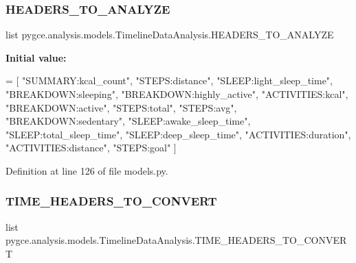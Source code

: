 \subsubsection{\texorpdfstring{H\+E\+A\+D\+E\+R\+S\+\_\+\+T\+O\+\_\+\+A\+N\+A\+L\+Y\+ZE}{HEADERS\_TO\_ANALYZE}}
{\footnotesize\ttfamily list pygce.\+analysis.\+models.\+Timeline\+Data\+Analysis.\+H\+E\+A\+D\+E\+R\+S\+\_\+\+T\+O\+\_\+\+A\+N\+A\+L\+Y\+ZE\hspace{0.3cm}{\ttfamily [static]}}

{\bfseries Initial value\+:}
\begin{DoxyCode}
=  [
        \textcolor{stringliteral}{"SUMMARY:kcal\_count"},
        \textcolor{stringliteral}{"STEPS:distance"},
        \textcolor{stringliteral}{"SLEEP:light\_sleep\_time"},
        \textcolor{stringliteral}{"BREAKDOWN:sleeping"},
        \textcolor{stringliteral}{"BREAKDOWN:highly\_active"},
        \textcolor{stringliteral}{"ACTIVITIES:kcal"},
        \textcolor{stringliteral}{"BREAKDOWN:active"},
        \textcolor{stringliteral}{"STEPS:total"},
        \textcolor{stringliteral}{"STEPS:avg"},
        \textcolor{stringliteral}{"BREAKDOWN:sedentary"},
        \textcolor{stringliteral}{"SLEEP:awake\_sleep\_time"},
        \textcolor{stringliteral}{"SLEEP:total\_sleep\_time"},
        \textcolor{stringliteral}{"SLEEP:deep\_sleep\_time"},
        \textcolor{stringliteral}{"ACTIVITIES:duration"},
        \textcolor{stringliteral}{"ACTIVITIES:distance"},
        \textcolor{stringliteral}{"STEPS:goal"}
    ]
\end{DoxyCode}


Definition at line 126 of file models.\+py.

\mbox{\label{classpygce_1_1analysis_1_1models_1_1_timeline_data_analysis_afaebf4ce7e847ff4c32a7b9b799fd94d}} 
\subsubsection{\texorpdfstring{T\+I\+M\+E\+\_\+\+H\+E\+A\+D\+E\+R\+S\+\_\+\+T\+O\+\_\+\+C\+O\+N\+V\+E\+RT}{TIME\_HEADERS\_TO\_CONVERT}}
{\footnotesize\ttfamily list pygce.\+analysis.\+models.\+Timeline\+Data\+Analysis.\+T\+I\+M\+E\+\_\+\+H\+E\+A\+D\+E\+R\+S\+\_\+\+T\+O\+\_\+\+C\+O\+N\+V\+E\+RT\hspace{0.3cm}{\ttfamily [static]}}

